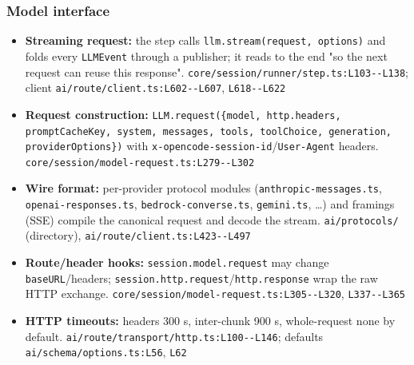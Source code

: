 \subsubsection*{Model interface}
\begin{itemize}
\item \textbf{Streaming request:} the step calls \texttt{llm.\allowbreak{}stream(\allowbreak{}request, options)} and folds every \texttt{LLMEvent} through a publisher; it reads to the end "so the next request can reuse this response". \texttt{core/\allowbreak{}session/\allowbreak{}runner/\allowbreak{}step.\allowbreak{}ts:\allowbreak{}L103-\allowbreak{}-\allowbreak{}L138}; client \texttt{ai/\allowbreak{}route/\allowbreak{}client.\allowbreak{}ts:\allowbreak{}L602-\allowbreak{}-\allowbreak{}L607}, \texttt{L618-\allowbreak{}-\allowbreak{}L622}
\item \textbf{Request construction:} \texttt{LLM.\allowbreak{}request(\allowbreak{}\{model, http.\allowbreak{}headers, promptCacheKey, system, messages, tools, toolChoice, generation, providerOptions\})} with \texttt{x-\allowbreak{}opencode-\allowbreak{}session-\allowbreak{}id}/\texttt{User-\allowbreak{}Agent} headers. \texttt{core/\allowbreak{}session/\allowbreak{}model-\allowbreak{}request.\allowbreak{}ts:\allowbreak{}L279-\allowbreak{}-\allowbreak{}L302}
\item \textbf{Wire format:} per-provider protocol modules (\texttt{anthropic-\allowbreak{}messages.\allowbreak{}ts}, \texttt{openai-\allowbreak{}responses.\allowbreak{}ts}, \texttt{bedrock-\allowbreak{}converse.\allowbreak{}ts}, \texttt{gemini.\allowbreak{}ts}, \ldots{}) and framings (SSE) compile the canonical request and decode the stream. \texttt{ai/\allowbreak{}protocols/\allowbreak{}} (directory), \texttt{ai/\allowbreak{}route/\allowbreak{}client.\allowbreak{}ts:\allowbreak{}L423-\allowbreak{}-\allowbreak{}L497}
\item \textbf{Route/header hooks:} \texttt{session.\allowbreak{}model.\allowbreak{}request} may change \texttt{baseURL}/headers; \texttt{session.\allowbreak{}http.\allowbreak{}request}/\texttt{http.\allowbreak{}response} wrap the raw HTTP exchange. \texttt{core/\allowbreak{}session/\allowbreak{}model-\allowbreak{}request.\allowbreak{}ts:\allowbreak{}L305-\allowbreak{}-\allowbreak{}L320}, \texttt{L337-\allowbreak{}-\allowbreak{}L365}
\item \textbf{HTTP timeouts:} headers 300 s, inter-chunk 900 s, whole-request none by default. \texttt{ai/\allowbreak{}route/\allowbreak{}transport/\allowbreak{}http.\allowbreak{}ts:\allowbreak{}L100-\allowbreak{}-\allowbreak{}L146}; defaults \texttt{ai/\allowbreak{}schema/\allowbreak{}options.\allowbreak{}ts:\allowbreak{}L56}, \texttt{L62}

\end{itemize}
